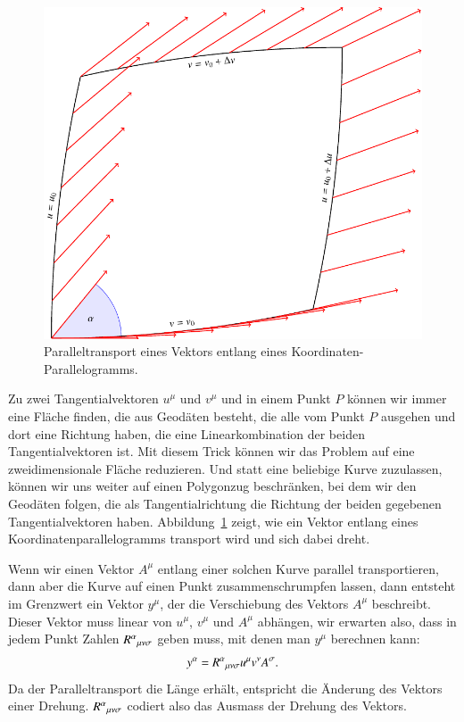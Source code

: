 \begin{figure}
\centering
\includegraphics{chapters/tikz/riemann.pdf}
\caption{Paralleltransport eines Vektors entlang eines
Koordinaten-Parallelogramms.
\label{skript:kruemmung:parallelogramm}}
\end{figure}

Zu zwei Tangentialvektoren $u^\mu$ und $v^\mu$ und in einem Punkt
$P$ können wir immer eine
Fläche finden, die aus Geodäten besteht, die alle vom Punkt $P$ ausgehen
und dort eine Richtung haben, die eine Linearkombination der beiden
Tangentialvektoren ist.
Mit diesem Trick können wir das Problem auf eine zweidimensionale
Fläche reduzieren.
Und statt eine beliebige Kurve zuzulassen, können wir uns weiter
auf einen Polygonzug beschränken, bei dem wir den Geodäten folgen,
die als Tangentialrichtung die Richtung der beiden gegebenen
Tangentialvektoren haben.
Abbildung~\ref{skript:kruemmung:parallelogramm} zeigt, wie ein Vektor
entlang eines Koordinatenparallelogramms transport wird und sich
dabei dreht.

Wenn wir einen Vektor $A^\mu$ entlang einer solchen Kurve parallel
transportieren, dann aber die Kurve auf einen Punkt zusammenschrumpfen
lassen, dann entsteht im Grenzwert ein Vektor $y^\mu$,
der die Verschiebung des Vektors $A^\mu$ beschreibt.
Dieser Vektor muss linear von $u^\mu$, $v^\mu$ und $A^\mu$ abhängen,
wir erwarten also, dass in jedem Punkt Zahlen
$R^\alpha\mathstrut_{\mu\nu\sigma}$ geben muss, mit denen man
$y^\mu$ berechnen kann:
\[
y^\alpha = R^\alpha\mathstrut_{\mu\nu\sigma}u^\mu v^\nu A^\sigma.
\]
Da der Paralleltransport die Länge erhält, entspricht die Änderung des
Vektors einer Drehung.
$R^\alpha\mathstrut_{\mu\nu\sigma}$ codiert also das Ausmass der
Drehung des Vektors.

